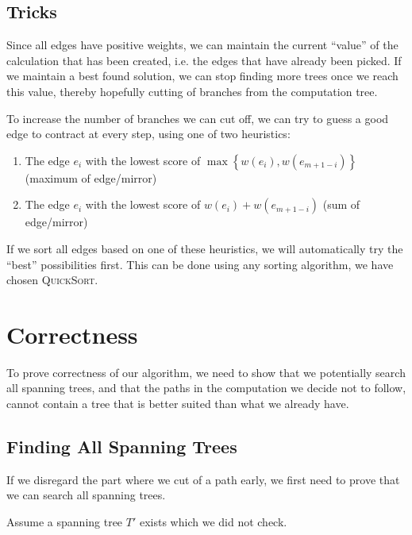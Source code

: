 \subsection{Tricks}
Since all edges have positive weights, we can maintain the current ``value'' of the calculation that has been created, i.e. the edges that have already been picked. If we maintain a best found solution, we can stop finding more trees once we reach this value, thereby hopefully cutting of branches from the computation tree.

To increase the number of branches we can cut off, we can try to guess a good edge to contract at every step, using one of two heuristics:

\begin{enumerate}
\item The edge $e_i$ with the lowest score of $\max\left\{w(e_i),w(e_{m+1-i})\right\}$  (maximum of edge/mirror)

\item The edge $e_i$ with the lowest score of $w(e_i)+w(e_{m+1-i})$ (sum of edge/mirror)
\end{enumerate}

If we sort all edges based on one of these heuristics, we will automatically try the ``best'' possibilities first. This can be done using any sorting algorithm, we have chosen \textsc{QuickSort}.

\section{Correctness}
To prove correctness of our algorithm, we need to show that we potentially search all spanning trees, and that the paths in the computation we decide not to follow, cannot contain a tree that is better suited than what we already have.

\subsection{Finding All Spanning Trees}

If we disregard the part where we cut of a path early, we first need to prove that we can search all spanning trees.

\noindent
Assume a spanning tree $T'$ exists which we did not check.

